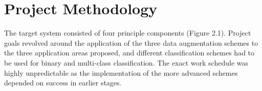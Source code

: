 \documentclass[12pt,twoside,notitlepage,amsart]{report} %
\begin{document}
%	
%	
%	
%	
%	
%	
	
	
	\section{Project Methodology}
	
	The target system consisted of four principle components (Figure 2.1). Project goals revolved around the application of the three data augmentation schemes to the three application areas proposed, and different classification schemes had to be used for binary and multi-class classification. The exact work schedule was highly unpredictable as the implementation of the more advanced schemes depended on success in earlier stages. 
	
\end{document}
